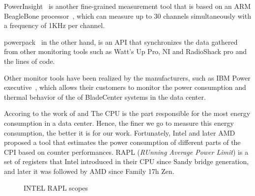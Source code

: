 PowerInsight~\cite{laros2013powerinsight} is another fine-grained measurement tool that is based on an ARM BeagleBone processor~\cite{coley2012beaglebone}, which can measure up to 30 channels simultaneously with a frequency of 1KHz per channel.

powerpack~\cite{ge2009powerpack} in the other hand, is an API that synchronizes the data gathered from other monitoring tools such as Watt’s Up Pro, NI and RadioShack pro and the lines of code. %

Other monitor tools have been realized by the manufacturers, such as IBM Power executive~\cite{koomey2011growth}, which allows their customers to monitor the power consumption and thermal behavior of the of BladeCenter systems in the data center.


Accoring to the work of \citeauthor{vasques2019review} and\citeauthor{wang2018modelling}
The CPU is the part responsible for the most energy consumption in a data center\cite{vasques2019review,wang2018modelling}. Hence, the finer we go to measure this energy consumption, the better it is for our work.
Fortunately, Intel and later AMD proposed a tool that estimates the power consumption of different parts of the CPI based on counter performances.
RAPL (\emph{RUnning Average Power Limit}) \cite{hackenberg2013power,hackenberg2015energy} is a set of registers that Intel introduced in their CPU since Sandy bridge generation, and later it was followed by AMD since Family 17h Zen.


\begin{figure}[!hbt]
    \caption{INTEL RAPL scopes
    }\label{fig:rapl-domaine}
\end{figure}

